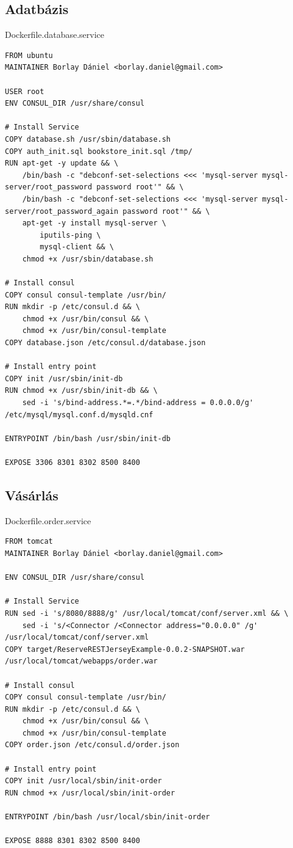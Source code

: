\documentclass[11pt,magyar,a4paper,twoside,]{report}
\begin{document}
\subsection{Adatbázis}\label{adatbuxe1zis}

Dockerfile.database.service

\begin{verbatim}
FROM ubuntu
MAINTAINER Borlay Dániel <borlay.daniel@gmail.com>

USER root
ENV CONSUL_DIR /usr/share/consul

# Install Service
COPY database.sh /usr/sbin/database.sh
COPY auth_init.sql bookstore_init.sql /tmp/
RUN apt-get -y update && \
    /bin/bash -c "debconf-set-selections <<< 'mysql-server mysql-server/root_password password root'" && \
    /bin/bash -c "debconf-set-selections <<< 'mysql-server mysql-server/root_password_again password root'" && \
    apt-get -y install mysql-server \
        iputils-ping \
        mysql-client && \
    chmod +x /usr/sbin/database.sh

# Install consul
COPY consul consul-template /usr/bin/
RUN mkdir -p /etc/consul.d && \
    chmod +x /usr/bin/consul && \
    chmod +x /usr/bin/consul-template
COPY database.json /etc/consul.d/database.json

# Install entry point
COPY init /usr/sbin/init-db
RUN chmod +x /usr/sbin/init-db && \
    sed -i 's/bind-address.*=.*/bind-address = 0.0.0.0/g' /etc/mysql/mysql.conf.d/mysqld.cnf

ENTRYPOINT /bin/bash /usr/sbin/init-db

EXPOSE 3306 8301 8302 8500 8400
\end{verbatim}

\subsection{Vásárlás}\label{vuxe1suxe1rluxe1s}

Dockerfile.order.service

\begin{verbatim}
FROM tomcat
MAINTAINER Borlay Dániel <borlay.daniel@gmail.com>

ENV CONSUL_DIR /usr/share/consul

# Install Service
RUN sed -i 's/8080/8888/g' /usr/local/tomcat/conf/server.xml && \
    sed -i 's/<Connector /<Connector address="0.0.0.0" /g' /usr/local/tomcat/conf/server.xml
COPY target/ReserveRESTJerseyExample-0.0.2-SNAPSHOT.war /usr/local/tomcat/webapps/order.war

# Install consul
COPY consul consul-template /usr/bin/
RUN mkdir -p /etc/consul.d && \
    chmod +x /usr/bin/consul && \
    chmod +x /usr/bin/consul-template
COPY order.json /etc/consul.d/order.json

# Install entry point
COPY init /usr/local/sbin/init-order
RUN chmod +x /usr/local/sbin/init-order

ENTRYPOINT /bin/bash /usr/local/sbin/init-order

EXPOSE 8888 8301 8302 8500 8400
\end{verbatim}
\end{document}
